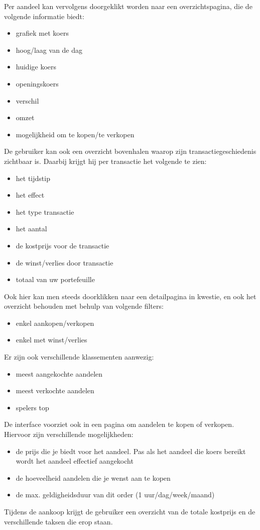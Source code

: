 Per aandeel kan vervolgens doorgeklikt worden naar een overzichtspagina, die de volgende informatie biedt:
\begin{itemize}
\item{grafiek met koers}
\item{hoog/laag van de dag}
\item{huidige koers}
\item{openingskoers}
\item{verschil}
\item{omzet}
\item{mogelijkheid om te kopen/te verkopen}
\end{itemize}

De gebruiker kan ook een overzicht bovenhalen waarop zijn transactiegeschiedenis zichtbaar is. Daarbij krijgt hij per transactie het volgende te zien:
\begin{itemize}
\item{het tijdstip}
\item{het effect}
\item{het type transactie}
\item{het aantal}
\item{de kostprijs voor de transactie}
\item{de winst/verlies door transactie}
\item{totaal van uw portefeuille}
\end{itemize}
Ook hier kan men steeds doorklikken naar een detailpagina in kwestie, en ook het overzicht behouden met behulp van volgende filters:
\begin{itemize}
\item{enkel aankopen/verkopen}
\item{enkel met winst/verlies}
\end{itemize}

Er zijn ook verschillende klassementen aanwezig:
\begin{itemize}
\item{meest aangekochte aandelen}
\item{meest verkochte aandelen}
\item{spelers top}
\end{itemize}

De interface voorziet ook in een pagina om aandelen te kopen of verkopen. Hiervoor zijn verschillende mogelijkheden:
\begin{itemize}
\item{de prijs die je biedt voor het aandeel. Pas als het aandeel die koers bereikt wordt het aandeel effectief aangekocht}
\item{de hoeveelheid aandelen die je wenst aan te kopen}
\item{de max. geldigheidsduur van dit order (1 uur/dag/week/maand)}
\end{itemize}
Tijdens de aankoop krijgt de gebruiker een overzicht van de totale kostprijs en de verschillende taksen die erop staan.


